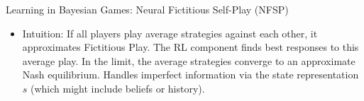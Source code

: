 \documentclass[10pt]{beamer}
\begin{document}
\begin{frame}{Learning in Bayesian Games: Neural Fictitious Self-Play (NFSP)}
\begin{itemize}
\begin{itemize}
\begin{equation*}
              \end{equation*}
         \end{itemize}
        \vspace{0.2cm}
        \item Intuition: If all players play average strategies against each other, it approximates Fictitious Play. The RL component finds best responses to this average play. In the limit, the average strategies converge to an approximate Nash equilibrium. Handles imperfect information via the state representation $s$ (which might include beliefs or history).
    \end{itemize}
\end{frame}

\end{document}
